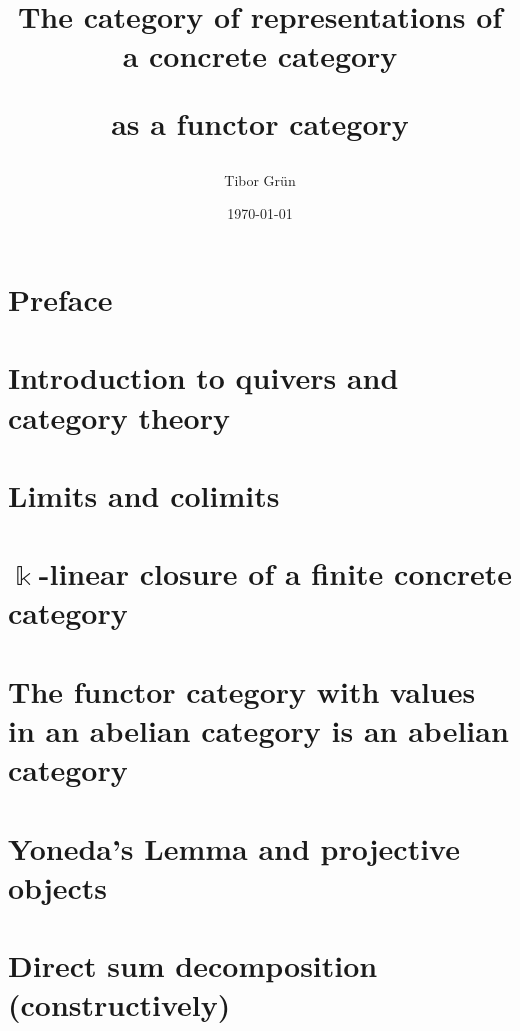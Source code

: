 \documentclass[a4paper,12pt]{article}
\title{The category of representations of a concrete category\par as a functor category}
\author{Tibor Gr{\"u}n}
\date{\today}
\begin{document}

	

	\newpage
	\phantom{}%
	\newpage

	\tableofcontents\label{toc}
	
	\newpage
	\phantom{}%
	\newpage

	
\section*{Preface}

\newpage
\section{Introduction to quivers and category theory}


\newpage
\section{Limits and colimits}


\newpage
\section{$\Bbbk$-linear closure of a finite concrete category}


\newpage
\section{The functor category with values in an abelian category is an abelian category}


\newpage
\section{Yoneda's Lemma and projective objects}


\newpage
\section{Direct sum decomposition (constructively)}

\end{document}
